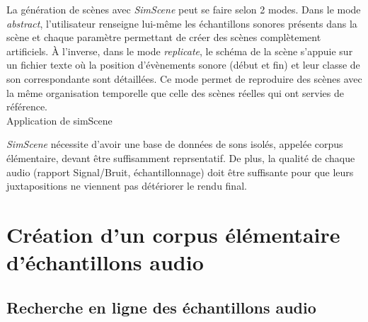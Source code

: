 La génération de scènes avec \textit{SimScene} peut se faire selon 2 modes. Dans le mode \textit{abstract}, l'utilisateur renseigne lui-même les échantillons sonores présents dans la scène et chaque paramètre permettant de créer des scènes complètement artificiels. \`A l'inverse, dans le mode \textit{replicate}, le schéma de la scène s'appuie sur un fichier texte où la position d'évènements sonore (début et fin) et leur classe de son correspondante sont détaillées. Ce mode permet de reproduire des scènes avec la même organisation temporelle que celle des scènes réelles qui ont servies de référence.\\

Application de simScene \cite{lagrange2015evaluation} \cite{lafay2015approaching} 

\textit{SimScene} nécessite d'avoir une base de données de sons isolés, appelée corpus élémentaire, devant être suffisamment reprsentatif. De plus, la qualité de chaque audio (rapport Signal/Bruit, échantillonnage) doit être suffisante pour que leurs juxtapositions ne viennent pas détériorer le rendu final.


\section{Création d'un corpus élémentaire d'échantillons audio}

\subsection{Recherche en ligne des échantillons audio}

